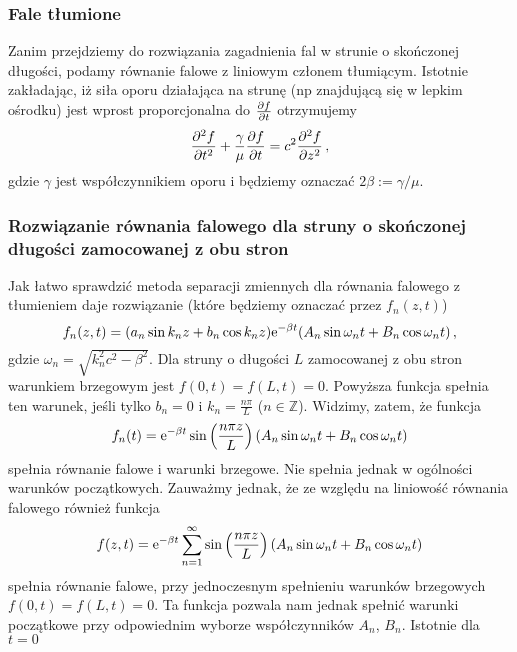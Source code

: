 \documentclass[../main.tex]{subfiles}
\begin{document}
        \subsubsection{Fale tłumione}
        Zanim przejdziemy do rozwiązania zagadnienia fal w strunie o skończonej długości, podamy równanie falowe z liniowym członem tłumiącym. Istotnie zakładając, iż siła oporu działająca na strunę (np znajdującą się w lepkim  ośrodku) jest wprost proporcjonalna do \(\pdv{f}{t}\) otrzymujemy
        \begin{equation*}
            \pdv[2]{f}{t}+\frac{\gamma}{\mu}\pdv{f}{t}=c^2\pdv[2]{f}{z}\,,
        \end{equation*}
        gdzie \(\gamma\) jest współczynnikiem oporu i będziemy oznaczać \(2\beta:=\gamma/\mu\).
        \subsubsection{Rozwiązanie równania falowego dla struny o skończonej długości zamocowanej z obu stron}
        Jak łatwo sprawdzić metoda separacji zmiennych dla równania falowego z tłumieniem daje rozwiązanie (które będziemy oznaczać przez \(f_n(z,t)\))
        \begin{equation*}
            f_n(z,t)=(a_n\sin k_nz+b_n\cos k_nz)\mathrm{e}^{-\beta t}(A_n\sin\omega_n t+B_n\cos\omega_n t)\,,
        \end{equation*}
        gdzie \(\omega_n=\sqrt{k_n^2c^2-\beta^2}\). Dla struny o długości \(L\) zamocowanej z obu stron warunkiem brzegowym jest \(f(0,t)=f(L,t)=0\). Powyższa funkcja spełnia ten warunek, jeśli tylko \(b_n=0\) i \(k_n=\frac{n\pi}{L}\) (\(n\in\mathbb{Z}\)). Widzimy, zatem, że funkcja
        \begin{equation*}
            f_n(t)=\mathrm{e}^{-\beta t}\sin\left(\frac{n\pi z}{L}\right)(A_n\sin\omega_n t+B_n\cos\omega_n t)
        \end{equation*}
        spełnia równanie falowe i warunki brzegowe. Nie spełnia jednak w ogólności warunków początkowych. Zauważmy jednak, że ze względu na liniowość równania falowego również funkcja
        \begin{equation*}
            f(z,t)=\mathrm{e}^{-\beta t}\sum_{n=1}^\infty\sin\left(\frac{n\pi z}{L}\right)(A_n\sin\omega_n t+B_n\cos\omega_n t)
        \end{equation*}
        spełnia równanie falowe, przy jednoczesnym spełnieniu warunków brzegowych \(f(0,t)=f(L,t)=0\). Ta funkcja pozwala nam jednak spełnić warunki początkowe przy odpowiednim wyborze współczynników \(A_n\), \(B_n\). Istotnie dla \(t=0\)
\end{document}
